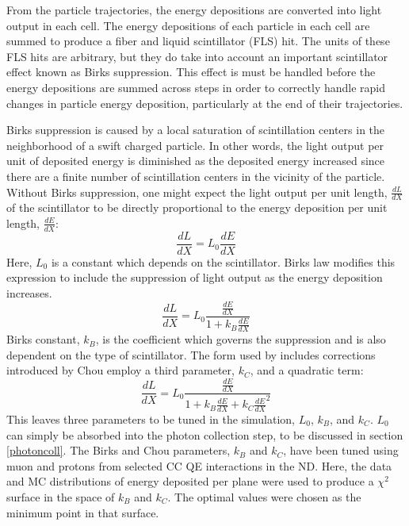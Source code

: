 From the \geant particle trajectories, the energy depositions are converted into light output in each cell.  The energy depositions of each particle in each cell are summed to produce a fiber and liquid scintillator (FLS) hit.  The units of these FLS hits are arbitrary, but they do take into account an important scintillator effect known as Birks suppression. \cite{birks1951scintillations}  This effect is must be handled before the energy depositions are summed across steps in order to correctly handle rapid changes in particle energy deposition, particularly at the end of their trajectories.

Birks suppression is caused by a local saturation of scintillation centers in the neighborhood of a swift charged particle.  In other words, the light output per unit of deposited energy is diminished as the deposited energy increased since there are a finite number of scintillation centers in the vicinity of the particle.  Without Birks suppression, one might expect the light output per unit length, $\frac{dL}{dX}$ of the scintillator to be directly proportional to the energy deposition per unit length, $\frac{dE}{dX}$:
\begin{equation}
\frac{dL}{dX} = L_0  \frac{dE}{dX}
\end{equation}
Here, $L_0$ is a constant which depends on the scintillator.  Birks law modifies this expression to include the suppression of light output as the energy deposition increases.
\begin{equation}
\frac{dL}{dX} = L_0  \frac{\frac{dE}{dX}}{1+ k_B \frac{dE}{dX}}
\end{equation}
Birks constant, $k_B$, is the coefficient which governs the suppression and is also dependent on the type of scintillator.  The form used by \nova includes corrections introduced by Chou \cite{chou1952nature} employ a third parameter, $k_C$, and a quadratic term:
\begin{equation}
\frac{dL}{dX} = L_0  \frac{\frac{dE}{dX}}{1+ k_B \frac{dE}{dX} + k_C \frac{dE}{dX}^2}
\end{equation}
This leaves three parameters to be tuned in the simulation, $L_0$, $k_B$, and $k_C$.  $L_0$ can simply be absorbed into the photon collection step, to be discussed in section \ref{photoncoll}.  The Birks and Chou parameters, $k_B$ and $k_C$, have been tuned using muon and protons from selected \numu CC QE interactions in the ND.  Here, the data and MC distributions of energy deposited per plane were used to produce a $\chi^2$ surface in the space of $k_B$ and $k_C$.  The optimal values were chosen as the minimum point in that surface.


